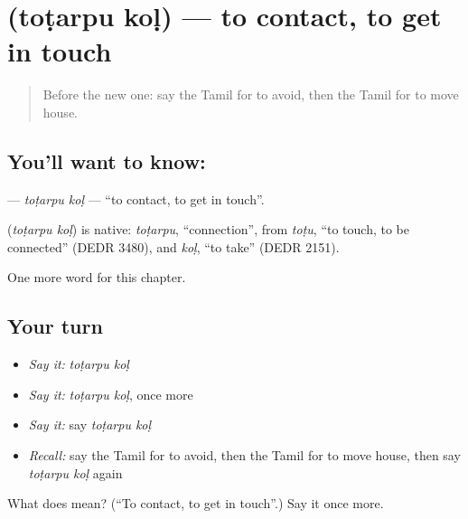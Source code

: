 \section[\texorpdfstring{\ta{தொடர்பு} \ta{கொள்} (toṭarpu koḷ)}{தொடர்பு கொள் (toṭarpu koḷ)}]{  (toṭarpu koḷ) — to contact, to get in touch}

\label{lesson:TA-C197-totarpu-kol}



\begin{quote}
Before the new one: say the Tamil for to avoid, then the Tamil for to move house.
\end{quote}

\subsection*{You'll want to know:  }
\textbf{ } — \emph{toṭarpu koḷ} — \textquotedblleft{}to contact, to get in touch\textquotedblright{}.

\begin{cousinweb}
\textbf{ } (\emph{toṭarpu koḷ}) is native: \emph{toṭarpu}, \textquotedblleft{}connection\textquotedblright{}, from \emph{toṭu}, \textquotedblleft{}to touch, to be connected\textquotedblright{} (DEDR 3480), and \emph{koḷ}, \textquotedblleft{}to take\textquotedblright{} (DEDR 2151).
\end{cousinweb}

\begin{grammarlens}[title={What you've built}]
One more word for this chapter.
\end{grammarlens}

\subsection*{Your turn}
\begin{itemize}
\raggedright
  \item \emph{Say it:} \emph{toṭarpu koḷ}
  \item \emph{Say it:} \emph{toṭarpu koḷ}, once more
  \item \emph{Say it:} say \emph{toṭarpu koḷ}
  \item \emph{Recall:} say the Tamil for to avoid, then the Tamil for to move house, then say \emph{toṭarpu koḷ} again
\end{itemize}

\begin{tcolorbox}[breakable,colback=teal!4,colframe=teal!35!black,title={Before you move on}]
What does   mean? (\textquotedblleft{}To contact, to get in touch\textquotedblright{}.) Say it once more.
\end{tcolorbox}
